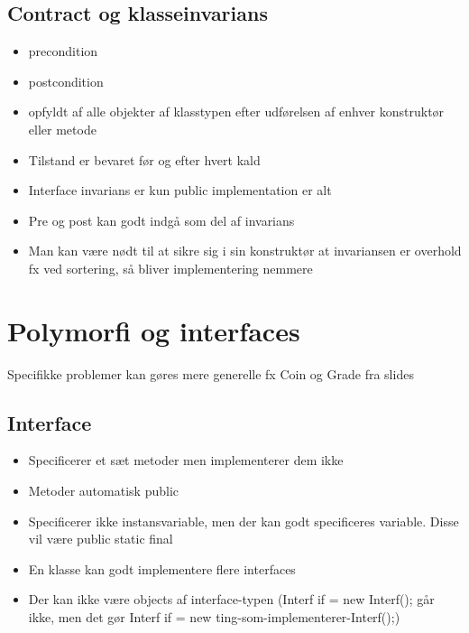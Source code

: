 \subsection{Contract og klasseinvarians} %
\label{sub:contract_og_klasseinvarians}
\begin{itemize}
    \item precondition
    \item postcondition
    \item opfyldt af alle objekter af klasstypen efter udførelsen af enhver konstruktør eller metode
    \item Tilstand er bevaret før og efter hvert kald
    \item Interface invarians er kun public implementation er alt
    \item Pre og post kan godt indgå som del af invarians
    \item Man kan være nødt til at sikre sig i sin konstruktør at invariansen er overhold fx ved sortering, så bliver implementering nemmere
\end{itemize}
\newpage
\section{Polymorfi og interfaces} %
\label{sec:polymorfi_og_interfaces}
Specifikke problemer kan gøres mere generelle fx Coin og Grade fra slides
\subsection{Interface} %
\label{sub:interface}
\begin{itemize}
    \item Specificerer et sæt metoder men implementerer dem ikke
    \item Metoder automatisk public
    \item Specificerer ikke instansvariable, men der kan godt specificeres variable. Disse vil være public static final
    \item En klasse kan godt implementere flere interfaces
    \item Der kan ikke være objects af interface-typen (Interf if = new Interf(); går ikke, men det gør Interf if = new ting-som-implementerer-Interf();)
\end{itemize}
